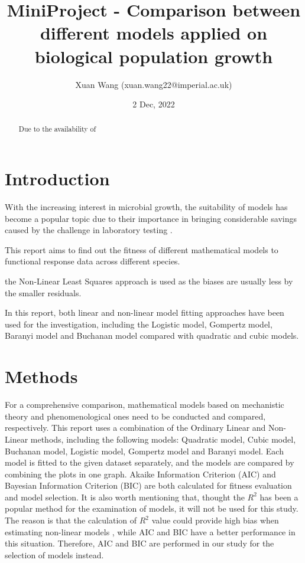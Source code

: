 \documentclass[11pt, oneside]{article}
\title{MiniProject - Comparison between different models applied on biological population growth}
\author{Xuan Wang (xuan.wang22@imperial.ac.uk)}
\date{2 Dec, 2022}
\begin{document}
	\maketitle
	\newpage

	\begin{abstract}
	Due to the availability of 
	\end{abstract}
	\pagebreak

	\section{Introduction}

	With the increasing interest in microbial growth, the suitability of models has become a popular topic due to their importance in bringing considerable savings caused by the challenge in laboratory testing \cite{Perni}.
	
	This report aims to find out the fitness of different mathematical models to functional response data across different species.
	
	the Non-Linear Least Squares approach is used as the biases are usually less by the smaller residuals. 

	In this report, both linear and non-linear model fitting approaches have been used for the investigation, including the Logistic model, Gompertz model, Baranyi model and Buchanan model compared with quadratic and cubic models.

	\pagebreak

	\section{Methods}


	For a comprehensive comparison, mathematical models based on mechanistic theory and phenomenological ones need to be conducted and compared, respectively. This report uses a combination of the Ordinary Linear and Non-Linear methods, including the following models: Quadratic model, Cubic model, Buchanan model, Logistic model, Gompertz model and Baranyi model. Each model is fitted to the given dataset separately, and the models are compared by combining the plots in one graph. Akaike Information Criterion (AIC) and Bayesian Information Criterion (BIC) are both calculated for fitness evaluation and model selection. It is also worth mentioning that, thought the \(R^2\) has been a popular method for the examination of models, it will not be used for this study. The reason is that the calculation of \(R^2\) value could provide high bias when estimating non-linear models \cite{Spiess and Neumeyer}, while AIC and BIC have a better performance in this situation. Therefore, AIC and BIC are performed in our study for the selection of models instead.
\end{document}

